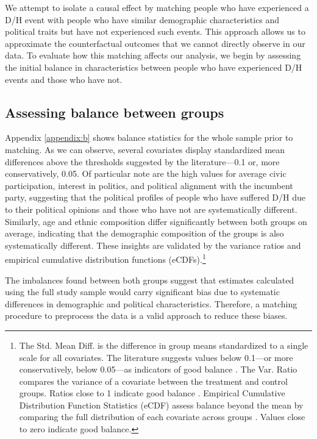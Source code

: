 \documentclass{article}
\begin{document}
We attempt to isolate a causal effect by matching people who have experienced a D/H event with people who have similar demographic characteristics and political traits but have not experienced such events. This approach allows us to approximate the counterfactual outcomes that we cannot directly observe in our data. To evaluate how this matching affects our analysis, we begin by assessing the initial balance in characteristics between people who have experienced D/H events and those who have not.

\subsection{Assessing balance between groups}

Appendix \ref{appendix:b} shows balance statistics for the whole sample prior to matching. As we can observe, several covariates display standardized mean differences above the thresholds suggested by the literature—0.1 or, more conservatively, 0.05. Of particular note are the high values for average civic participation, interest in politics, and political alignment with the incumbent party, suggesting that the political profiles of people who have suffered D/H due to their political opinions and those who have not are systematically different. Similarly, age and ethnic composition differ significantly between both groups on average, indicating that the demographic composition of the groups is also systematically different. These insights are validated by the variance ratios and empirical cumulative distribution functions (eCDFs).\footnote{The Std. Mean Diff. is the difference in group means standardized to a single scale for all covariates. The literature suggests values below 0.1—or more conservatively, below 0.05—as indicators of good balance \parencite{ali_propensity_2014, stuart_prognostic_2013}. The Var. Ratio compares the variance of a covariate between the treatment and control groups. Ratios close to 1 indicate good balance \parencite{austin_balance_2009}. Empirical Cumulative Distribution Function Statistics (eCDF) assess balance beyond the mean by comparing the full distribution of each covariate across groups \parencite{mccaffrey_propensity_2004}. Values close to zero indicate good balance.}

The imbalances found between both groups suggest that estimates calculated using the full study sample would carry significant bias due to systematic differences in demographic and political characteristics. Therefore, a matching procedure to preprocess the data is a valid approach to reduce these biases.
\end{document}
